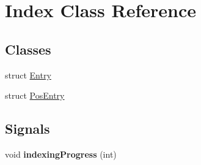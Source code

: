 \hypertarget{classIndex}{
\section{Index Class Reference}
\label{classIndex}
}
\subsection*{Classes}
\begin{DoxyCompactItemize}
\item 
struct \hyperlink{structIndex_1_1Entry}{Entry}
\item 
struct \hyperlink{structIndex_1_1PosEntry}{PosEntry}
\end{DoxyCompactItemize}
\subsection*{Signals}
\begin{DoxyCompactItemize}
\item 
\hypertarget{classIndex_ae4d757e07e0a13eabd71bab61bcfc438}{
void {\bfseries indexingProgress} (int)}
\label{classIndex_ae4d757e07e0a13eabd71bab61bcfc438}

\end{DoxyCompactItemize}
